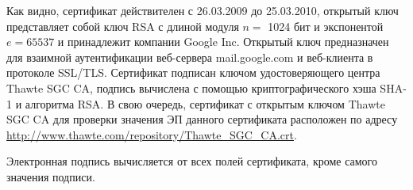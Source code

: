 Как видно, сертификат действителен с 26.03.2009 до 25.03.2010, открытый ключ представляет собой ключ RSA с длиной модуля $n=$ 1024 бит и экспонентой $e = 65537$ и принадлежит компании Google Inc. Открытый ключ предназначен для взаимной аутентификации веб-сервера mail.google.com и веб-клиента в протоколе SSL/TLS. Сертификат подписан ключом удостоверяющего центра Thawte SGC CA, подпись вычислена с помощью криптографического хэша SHA-1 и алгоритма RSA. В свою очередь, сертификат с открытым ключом Thawte SGC CA для проверки значения ЭП данного сертификата расположен по адресу \url{http://www.thawte.com/repository/Thawte\_SGC\_CA.crt}.

Электронная подпись вычисляется от всех полей сертификата, кроме самого значения подписи.
